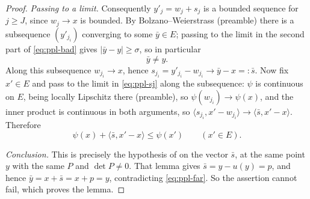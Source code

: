 \begin{proof}
\emph{Passing to a limit.}
Consequently $y'_j=w_j+s_j$ is a bounded sequence for $j\ge J$, since $w_j\to x$
is bounded. By Bolzano--Weierstrass (preamble) there is a subsequence
$(y'_{j_i})$ converging to some $\bar y\in E$; passing to the limit in the second
part of \eqref{eq:ppl-bad} gives $|\bar y-y|\ge\sigma$, so in particular
\begin{equation}\label{eq:ppl-far}
  \bar y\ne y .
\end{equation}
Along this subsequence $w_{j_i}\to x$, hence
$s_{j_i}=y'_{j_i}-w_{j_i}\to\bar y-x=:\bar s$. Now fix $x'\in E$ and pass to the
limit in \eqref{eq:ppl-sj} along the subsequence: $\psi$ is continuous on $E$,
being locally Lipschitz there (preamble), so $\psi(w_{j_i})\to\psi(x)$, and the
inner product is continuous in both arguments, so
$\langle s_{j_i},x'-w_{j_i}\rangle\to\langle\bar s,x'-x\rangle$. Therefore
\[
  \psi(x)+\langle\bar s,x'-x\rangle\le\psi(x')\qquad(x'\in E).
\]

\emph{Conclusion.}
This is precisely the hypothesis of
 on the vector $\bar s$, at the same point
$y$ with the same $P$ and $\det P\ne0$. That lemma gives $\bar s=y-u(y)=p$, and
hence $\bar y=x+\bar s=x+p=y$, contradicting \eqref{eq:ppl-far}. So the assertion
cannot fail, which proves the lemma.
\end{proof}
